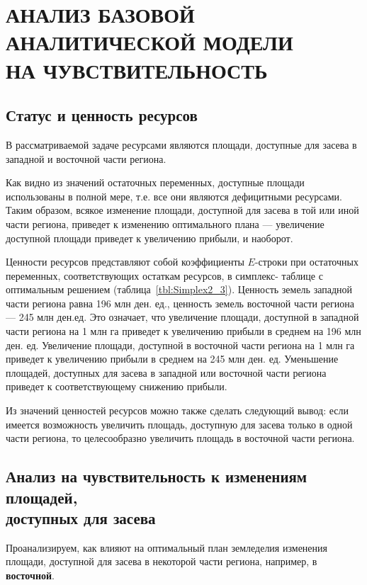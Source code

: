 \section[Анализ базовой аналитической модели на чувствительность]{АНАЛИЗ БАЗОВОЙ АНАЛИТИЧЕСКОЙ МОДЕЛИ \\ НА ЧУВСТВИТЕЛЬНОСТЬ}

\subsection{Статус и ценность ресурсов}

В рассматриваемой задаче ресурсами являются площади, доступные для засева
в западной и восточной части региона.

Как видно из значений остаточных переменных, доступные площади использованы
в полной мере, т.е. все они являются дефицитными ресурсами. Таким образом,
всякое изменение площади, доступной для засева в той или иной части региона, 
приведет к изменению оптимального плана --- увеличение доступной площади
приведет к увеличению прибыли, и наоборот.

Ценности ресурсов представляют собой коэффициенты $ E $-строки при
остаточных переменных, соответствующих остаткам ресурсов, в симплекс-
таблице с оптимальным решением (таблица~\ref{tbl:Simplex2_3}).
Ценность земель западной части региона равна 196 млн ден. ед.,
ценность земель восточной части региона --- 245 млн ден.ед.
Это означает, что увеличение площади, доступной в западной части региона
на 1 млн га приведет к увеличению прибыли в среднем на 196 млн ден. ед.
Увеличение площади, доступной в восточной части региона
на 1 млн га приведет к увеличению прибыли в среднем на 245 млн ден. ед.
Уменьшение площадей, доступных для засева в западной или восточной части региона
приведет к соответствующему снижению прибыли.

Из значений ценностей ресурсов можно также сделать следующий вывод:
если имеется возможность увеличить площадь, доступную для засева
  только в одной части региона, то целесообразно увеличить площадь в восточной части региона.

\subsection{Анализ на чувствительность к изменениям площадей, \\ доступных для засева}

Проанализируем, как влияют на оптимальный план земледелия изменения площади,
доступной для засева в некоторой части региона, например, в \textbf{восточной}.

